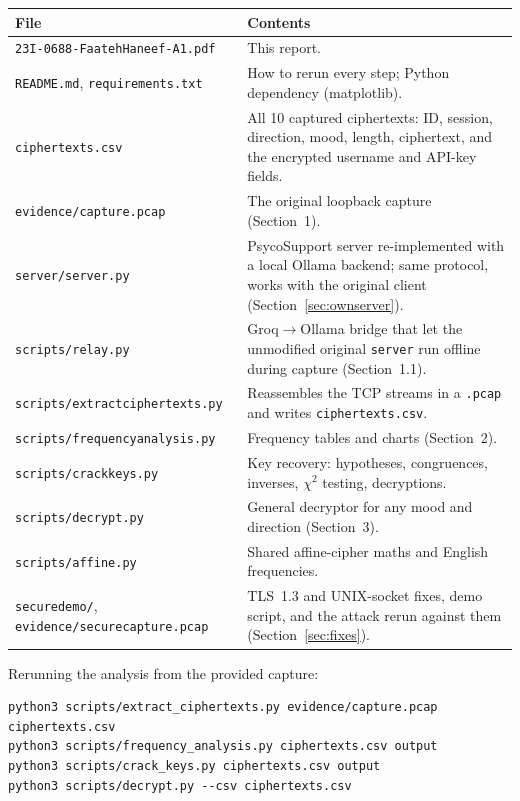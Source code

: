 \documentclass[11pt,a4paper]{article}
\DeclareRobustCommand{\_}{\textunderscore\allowbreak}  %
\newcommand{\ct}[1]{\texttt{#1}}
\begin{document}
\begin{table}[H]\centering
\begin{tabularx}{\textwidth}{l X}
\toprule
File & Contents \\
\midrule
\ct{23I-0688-FaatehHaneef-A1.pdf} & This report. \\
\ct{README.md}, \ct{requirements.txt} & How to rerun every step; Python dependency (matplotlib). \\
\ct{ciphertexts.csv} & All 10 captured ciphertexts: ID, session, direction, mood, length, ciphertext, and the
                       encrypted username and API-key fields. \\
\ct{evidence/capture.pcap} & The original loopback capture (Section~1). \\
\ct{server/server.py} & PsycoSupport server re-implemented with a local Ollama backend; same protocol, works with the
                 original client (Section~\ref{sec:ownserver}). \\
\ct{scripts/relay.py} & Groq$\rightarrow$Ollama bridge that let the unmodified original \ct{server} run offline during
                capture (Section~1.1). \\
\ct{scripts/extract\_ciphertexts.py} & Reassembles the TCP streams in a \ct{.pcap} and writes \ct{ciphertexts.csv}. \\
\ct{scripts/frequency\_analysis.py} & Frequency tables and charts (Section~2). \\
\ct{scripts/crack\_keys.py} & Key recovery: hypotheses, congruences, inverses, $\chi^2$ testing, decryptions. \\
\ct{scripts/decrypt.py} & General decryptor for any mood and direction (Section~3). \\
\ct{scripts/affine.py} & Shared affine-cipher maths and English frequencies. \\
\ct{secure\_demo/}, \ct{evidence/secure\_capture.pcap} & TLS~1.3 and UNIX-socket fixes, demo script, and the
                attack rerun against them (Section~\ref{sec:fixes}). \\
\bottomrule
\end{tabularx}
\end{table}

Rerunning the analysis from the provided capture:
\begin{lstlisting}
python3 scripts/extract_ciphertexts.py evidence/capture.pcap ciphertexts.csv
python3 scripts/frequency_analysis.py ciphertexts.csv output
python3 scripts/crack_keys.py ciphertexts.csv output
python3 scripts/decrypt.py --csv ciphertexts.csv
\end{lstlisting}
\end{document}

